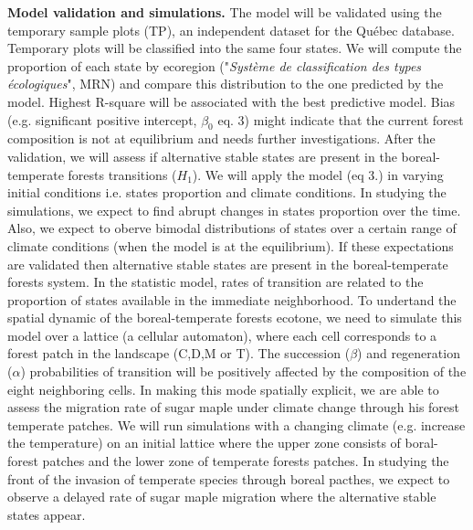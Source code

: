 \textbf{Model validation and simulations.}  The model will be validated using
the temporary sample plots (TP), an independent dataset for the Québec
database. Temporary plots will be classified into the same four states. We
will compute the proportion of each state by ecoregion ("\textit{Système de
classification des types écologiques}", MRN) and compare this distribution to
the one predicted by the model.  Highest R-square will be associated with the
best predictive model. Bias (e.g. significant positive intercept, $\beta_0$
eq. 3) might indicate that the current forest composition is not at
equilibrium and needs further investigations.  After the validation, we will
assess if alternative stable states are present in the boreal-temperate
forests transitions ($H_1$). We will apply the model (eq 3.) in varying
initial conditions i.e. states proportion and climate conditions. In studying
the simulations, we expect to find abrupt changes in states proportion over
the time. Also, we expect to oberve bimodal distributions of states over a
certain range of climate conditions (when the model is at the equilibrium). If
these expectations are validated then alternative stable states are present in
the boreal-temperate forests system. In the statistic model, rates of
transition are related to the proportion of states available in the immediate
neighborhood. To undertand the spatial dynamic of the boreal-temperate forests
ecotone, we need to simulate this model over a lattice (a cellular automaton),
where each cell corresponds to a forest patch in the landscape (C,D,M or T).
The succession ($\beta$) and regeneration ($\alpha$) probabilities of
transition will be positively affected by the composition of the eight
neighboring cells. In making this mode spatially explicit, we are able to
assess the migration rate of sugar maple under climate change through his
forest temperate patches. We will run simulations with a changing climate
(e.g. increase the temperature) on an initial lattice where the upper zone
consists of boral-forest patches and the lower zone of temperate forests
patches. In studying the front of the invasion of temperate species through
boreal pacthes, we expect to observe a delayed rate of sugar maple migration
where the alternative stable states appear.

